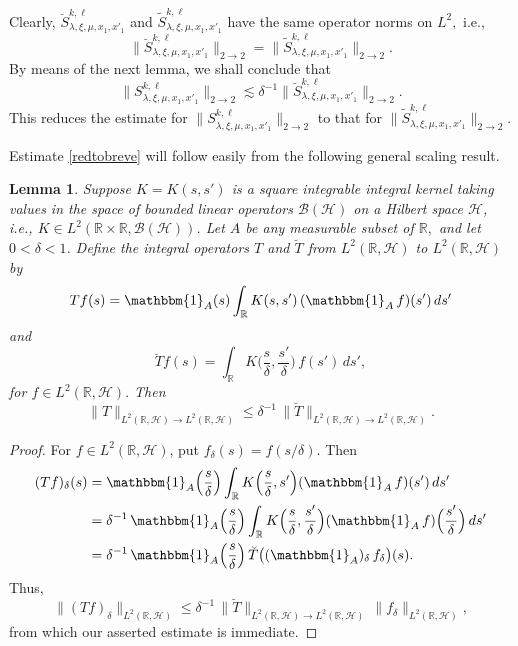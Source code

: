 \documentclass[leqno]{amsart}
\newtheorem{lemma}[theorem]{Lemma}
\theoremstyle{definition}
\theoremstyle{remark}
\numberwithin{equation}{section}
\newcommand{\bbone}{{\mathbbm{1}}}
\newcommand{\R}{\mathbb{R}}
\newcommand{\scriptB}{\mathcal{B}}
\newcommand{\scriptH}{\mathcal{H}}
\begin{document}
Clearly, $\breve S_{\lambda,\xi,\mu,x_1,x'_1}^{k,\ell}$ and $\tilde  S_{\lambda,\xi,\mu,x_1,x'_1}^{k,\ell}$ have the same operator norms on $L^2,$ i.e.,
\[
\|\breve S_{\lambda,\xi,\mu,x_1,x'_1}^{k,\ell} \|_{2\to 2}=\|\tilde S_{\lambda,\xi,\mu,x_1,x'_1}^{k,\ell} \|_{2\to 2}.
\]
By means of the next lemma, we   shall conclude  that
\begin{equation}\label{redtobreve}
\| S_{\lambda,\xi,\mu,x_1,x'_1}^{k,\ell} \|_{2\to 2} \lesssim \delta^{-1} \|\breve  S_{\lambda,\xi,\mu,x_1,x'_1}^{k,\ell} \|_{2\to 2}.
\end{equation}
This reduces the estimate for $\|S_{\lambda,\xi,\mu,x_1,x'_1}^{k,\ell}\|_{2\to2}$ to that for $\|\tilde S_{\lambda,\xi,\mu,x_1,x'_1}^{k,\ell}\|_{2\to2}$.

Estimate \eqref{redtobreve} will follow easily from the  following general scaling result.
\begin{lemma}\label{scaleins}
Suppose $K=K(s,s')$ is a square integrable  integral kernel taking values in the space of bounded linear  operators $\scriptB(\scriptH)$ on a Hilbert space $\scriptH$, i.e., $K\in L^2(\R\times\R, \scriptB(\scriptH))$. Let $A$ be any measurable subset of $\R,$ and let $0<\delta<1$.   
Define the integral operators $T$ and $\breve T$ from $L^2(\R,\scriptH)$ to $L^2(\R,\scriptH)$ by 
$$
T f(s)=\bbone_{A}(s) \int_{\R} K(s,s')\, (\bbone_{A}\, f)(s')\, ds'
$$
and 
$$
\breve T f(s)= \int_{\R} K\Big(\frac s \delta,\frac {s'}\delta\Big) \, f(s')\, ds',
$$
for $f\in L^2(\R,\scriptH).$ Then
\[
\|T\|_{L^2(\R,\scriptH)\to L^2(\R,\scriptH)} \le \delta^{-1} \, \|\breve T\|_{L^2(\R,\scriptH)\to L^2(\R,\scriptH)}.
\]
\end{lemma}


\begin{proof} For $f\in L^2(\R,\scriptH)$, put $f_\delta(s)=f(s/\delta).$ Then 
\begin{align*}
(Tf)_\delta (s) &=\bbone_A\Big(\frac s \delta\Big) \int_\R K\Big(\frac s \delta,s'\Big) (\bbone_A\, f)(s')\, ds'\\
&=\delta^{-1} \, \bbone_{A}\Big(\frac s \delta\Big) \int_\R K\Big(\frac s \delta,\frac{s'}\delta\Big) (\bbone_{A}\, f)\Big(\frac{s'}\delta\Big)\, ds'\\
&= \delta^{-1} \, \bbone_{A}\Big(\frac s \delta\Big) \, \breve T \big((\bbone_{A})_\delta \, f_\delta\big)(s).
\end{align*}
Thus,
\[
\|(Tf)_\delta\|_{L^2(\R,\scriptH)}
\le
\delta^{-1} \, \|\breve T\|_{L^2(\R,\scriptH)\to L^2(\R,\scriptH)} \,
\|f_\delta\|_{L^2(\R,\scriptH)},
\]
from which our asserted estimate is immediate.
\end{proof}
\end{document}
